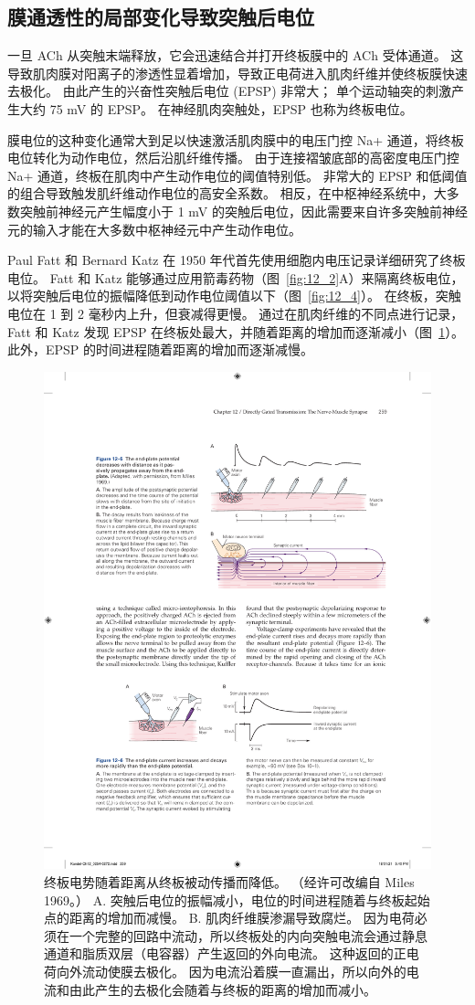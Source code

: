 \subsection{膜通透性的局部变化导致突触后电位}

一旦 ACh 从突触末端释放，它会迅速结合并打开终板膜中的 ACh 受体通道。
这导致肌肉膜对阳离子的渗透性显着增加，导致正电荷进入肌肉纤维并使终板膜快速去极化。
由此产生的兴奋性突触后电位 (EPSP) 非常大；
单个运动轴突的刺激产生大约 75 mV 的 EPSP。
在神经肌肉突触处，EPSP 也称为终板电位。


膜电位的这种变化通常大到足以快速激活肌肉膜中的电压门控 Na+ 通道，将终板电位转化为动作电位，然后沿肌纤维传播。
由于连接褶皱底部的高密度电压门控 Na+ 通道，终板在肌肉中产生动作电位的阈值特别低。
非常大的 EPSP 和低阈值的组合导致触发肌纤维动作电位的高安全系数。
相反，在中枢神经系统中，大多数突触前神经元产生幅度小于 1 mV 的突触后电位，因此需要来自许多突触前神经元的输入才能在大多数中枢神经元中产生动作电位。


Paul Fatt 和 Bernard Katz 在 1950 年代首先使用细胞内电压记录详细研究了终板电位。
Fatt 和 Katz 能够通过应用箭毒药物（图~\ref{fig:12_2}A）来隔离终板电位，以将突触后电位的振幅降低到动作电位阈值以下（图~\ref{fig:12_4}）。
在终板，突触电位在 1 到 2 毫秒内上升，但衰减得更慢。
通过在肌肉纤维的不同点进行记录，Fatt 和 Katz 发现 EPSP 在终板处最大，并随着距离的增加而逐渐减小（图~\ref{fig:12_5}）。
此外，EPSP 的时间进程随着距离的增加而逐渐减慢。


\begin{figure}[htbp]
	\centering
	\includegraphics[width=0.6\linewidth]{chap12/fig_12_5}
	\caption{终板电势随着距离从终板被动传播而降低。 （经许可改编自 Miles 1969。） 
		A. 突触后电位的振幅减小，电位的时间进程随着与终板起始点的距离的增加而减慢。 
		B. 肌肉纤维膜渗漏导致腐烂。 
		因为电荷必须在一个完整的回路中流动，所以终板处的内向突触电流会通过静息通道和脂质双层（电容器）产生返回的外向电流。 
		这种返回的正电荷向外流动使膜去极化。 
		因为电流沿着膜一直漏出，所以向外的电流和由此产生的去极化会随着与终板的距离的增加而减小。}
	\label{fig:12_5}
\end{figure}


